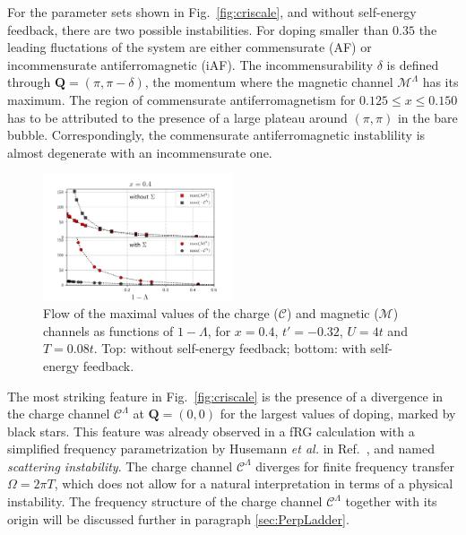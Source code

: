 For the parameter sets shown in Fig.~\ref{fig:criscale}, and without self-energy feedback, there are two possible instabilities. 
For doping smaller than $0.35$ the leading fluctations of the system are either commensurate (AF) or incommensurate antiferromagnetic (iAF).
The incommensurability $\delta$ is defined through $\mathbf{Q}=(\pi,\pi-\delta)$, the momentum where the magnetic channel $\mathcal{M}^\Lambda$ has its maximum. 
The region of commensurate antiferromagnetism for $0.125\le x \le 0.150$ has to be attributed to the presence of a large plateau around $(\pi,\pi)$ in the bare bubble. Correspondingly, the commensurate antiferromagnetic instablility is almost degenerate with an incommensurate one.
%
\begin{figure}
\includegraphics[width=0.50\textwidth]{images/chargeproblem_MC_vs_Lambda_fix_occ.png}
\caption{Flow of the maximal values of the charge ($\mathcal{C}$) and magnetic ($\mathcal{M}$) channels as functions of $1-\Lambda$, for  $x=0.4$, $t'=-0.32$, $U=4t$ and $T=0.08t$.  Top: without self-energy feedback; bottom: with self-energy feedback. }
\label{fig:chargeproblem}
\end{figure}
%

The most striking feature in Fig.~\ref{fig:criscale} is the presence of a divergence in the charge channel $\mathcal{C}^\Lambda$ at $\mathbf{Q}=(0,0)$ for the largest values of doping, marked by black stars. 
This feature was already observed in a fRG calculation with a simplified frequency parametrization by Husemann \textit{et al.} in Ref.~, and named \textit{scattering instability}. 
The charge channel $\mathcal{C}^\Lambda$ diverges for finite frequency transfer $\Omega=2\pi T$, which does not allow for a natural interpretation in terms of a physical instability. 
The frequency structure of the charge channel $\mathcal{C}^\Lambda$ together with its origin will be discussed further in paragraph \ref{sec:PerpLadder}.

